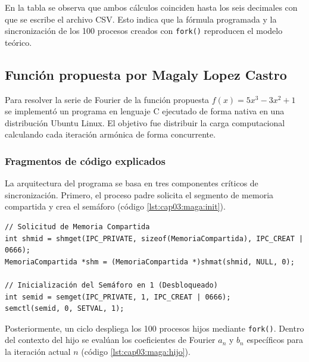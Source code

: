 En la tabla se observa que ambos cálculos coinciden hasta los seis decimales con que se escribe el archivo CSV. Esto indica que la fórmula programada y la sincronización de los 100 procesos creados con \texttt{fork()} reproducen el modelo teórico.



\subsection{Función propuesta por Magaly Lopez Castro}
\label{sec:cap03:maga}

Para resolver la serie de Fourier de la función propuesta $f(x) = 5x^{3} - 3x^{2} + 1$ se implementó un programa en lenguaje C ejecutado de forma nativa en una distribución Ubuntu Linux. El objetivo fue distribuir la carga computacional calculando cada iteración armónica de forma concurrente.

\subsubsection{Fragmentos de código explicados}
\label{sec:cap03:maga:codigo}

La arquitectura del programa se basa en tres componentes críticos de sincronización. Primero, el proceso padre solicita el segmento de memoria compartida y crea el semáforo (código \ref{lst:cap03:maga:init}).

\begin{lstlisting}[style=C, caption={Solicitud de memoria compartida e inicialización del semáforo en 1 (desbloqueado).}, label={lst:cap03:maga:init}]
// Solicitud de Memoria Compartida
int shmid = shmget(IPC_PRIVATE, sizeof(MemoriaCompartida), IPC_CREAT | 0666);
MemoriaCompartida *shm = (MemoriaCompartida *)shmat(shmid, NULL, 0);

// Inicialización del Semáforo en 1 (Desbloqueado)
int semid = semget(IPC_PRIVATE, 1, IPC_CREAT | 0666);
semctl(semid, 0, SETVAL, 1);
\end{lstlisting}

Posteriormente, un ciclo despliega los 100 procesos hijos mediante \texttt{fork()}. Dentro del contexto del hijo se evalúan los coeficientes de Fourier $a_n$ y $b_n$ específicos para la iteración actual $n$ (código \ref{lst:cap03:maga:hijo}).

